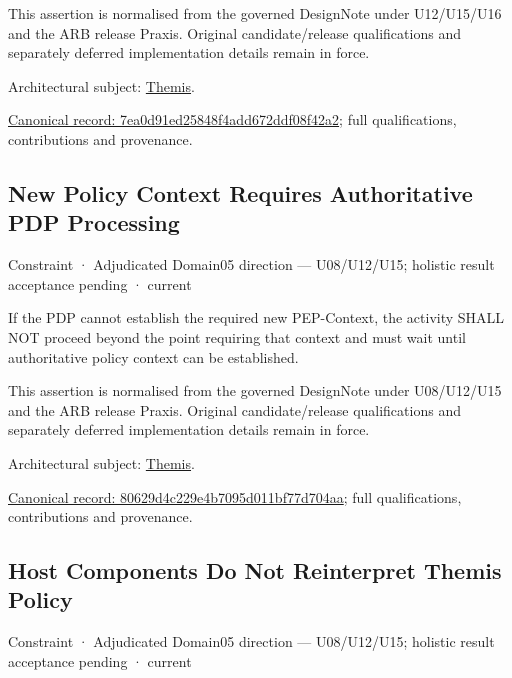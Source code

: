 This assertion is normalised from the governed DesignNote under U12/U15/U16 and the ARB release Praxis. Original candidate/release qualifications and separately deferred implementation details remain in force.



Architectural subject: \hyperref[element:899d34ec491948b68aad09e507dea6d1]{Themis}.


{\footnotesize \href{../../../../continuum/motivation/constraint/7ea0d91ed25848f4add672ddf08f42a2.md}{Canonical record: 7ea0d91ed25848f4add672ddf08f42a2}; full qualifications, contributions and provenance.}\par
\subsection{New Policy Context Requires Authoritative PDP Processing}

\label{element:80629d4c229e4b7095d011bf77d704aa}
{\small Constraint · Adjudicated Domain05 direction — U08/U12/U15; holistic result acceptance pending · current}\par

If the PDP cannot establish the required new PEP-Context, the activity SHALL NOT proceed beyond the point requiring that context and must wait until authoritative policy context can be established.



This assertion is normalised from the governed DesignNote under U08/U12/U15 and the ARB release Praxis. Original candidate/release qualifications and separately deferred implementation details remain in force.



Architectural subject: \hyperref[element:899d34ec491948b68aad09e507dea6d1]{Themis}.


{\footnotesize \href{../../../../continuum/motivation/constraint/80629d4c229e4b7095d011bf77d704aa.md}{Canonical record: 80629d4c229e4b7095d011bf77d704aa}; full qualifications, contributions and provenance.}\par
\subsection{Host Components Do Not Reinterpret Themis Policy}

\label{element:80e5d019948b4c16acb510547d7a3ac6}
{\small Constraint · Adjudicated Domain05 direction — U08/U12/U15; holistic result acceptance pending · current}\par

